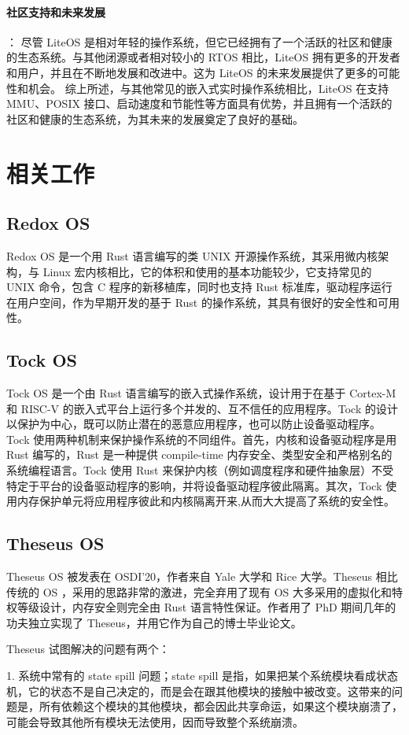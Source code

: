 \documentclass{article}
\begin{document}
\paragraph{社区支持和未来发展}： 尽管 LiteOS 是相对年轻的操作系统，但它已经拥有了一个活跃的社区和健康的生态系统。与其他闭源或者相对较小的 RTOS 相比，LiteOS 拥有更多的开发者和用户，并且在不断地发展和改进中。这为 LiteOS 的未来发展提供了更多的可能性和机会。
综上所述，与其他常见的嵌入式实时操作系统相比，LiteOS 在支持 MMU、POSIX 接口、启动速度和节能性等方面具有优势，并且拥有一个活跃的社区和健康的生态系统，为其未来的发展奠定了良好的基础。
\section{相关工作}
\subsection{Redox OS}
Redox OS 是一个用 Rust 语言编写的类 UNIX 开源操作系统，其采用微内核架构，与 Linux 宏内核相比，它的体积和使用的基本功能较少，它支持常见的 UNIX 命令，包含 C 程序的新移植库，同时也支持 Rust 标准库，驱动程序运行在用户空间，作为早期开发的基于 Rust 的操作系统，其具有很好的安全性和可用性。
\subsection{Tock OS}
Tock OS 是一个由 Rust 语言编写的嵌入式操作系统，设计用于在基于 Cortex-M 和 RISC-V 的嵌入式平台上运行多个并发的、互不信任的应用程序。Tock 的设计以保护为中心，既可以防止潜在的恶意应用程序，也可以防止设备驱动程序。Tock 使用两种机制来保护操作系统的不同组件。首先，内核和设备驱动程序是用 Rust 编写的，Rust 是一种提供 compile-time 内存安全、类型安全和严格别名的系统编程语言。Tock 使用 Rust 来保护内核（例如调度程序和硬件抽象层）不受特定于平台的设备驱动程序的影响，并将设备驱动程序彼此隔离。其次，Tock 使用内存保护单元将应用程序彼此和内核隔离开来,从而大大提高了系统的安全性。
\subsection{Theseus OS}
Theseus OS 被发表在 OSDI'20，作者来自 Yale 大学和 Rice 大学。Theseus 相比传统的 OS ，采用的思路非常的激进，完全弃用了现有 OS 大多采用的虚拟化和特权等级设计，内存安全则完全由 Rust 语言特性保证。作者用了 PhD 期间几年的功夫独立实现了 Theseus，并用它作为自己的博士毕业论文。\supercite{ref6}

Theseus 试图解决的问题有两个：

1. 系统中常有的 state spill 问题；state spill 是指，如果把某个系统模块看成状态机，它的状态不是自己决定的，而是会在跟其他模块的接触中被改变。这带来的问题是，所有依赖这个模块的其他模块，都会因此共享命运，如果这个模块崩溃了，可能会导致其他所有模块无法使用，因而导致整个系统崩溃。
\end{document}
